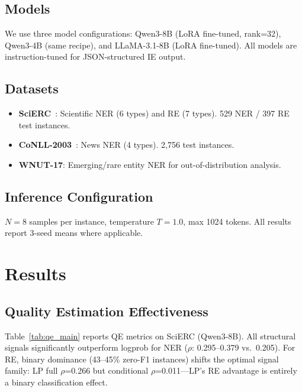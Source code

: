 \documentclass[11pt,a4paper]{article}
\begin{document}
\subsection{Models}
We use three model configurations: Qwen3-8B (LoRA fine-tuned, rank=32), Qwen3-4B (same recipe), and LLaMA-3.1-8B (LoRA fine-tuned). All models are instruction-tuned for JSON-structured IE output.

\subsection{Datasets}
\begin{itemize}
    \item \textbf{SciERC}~\cite{luan2018multi}: Scientific NER (6 types) and RE (7 types). 529 NER / 397 RE test instances.
    \item \textbf{CoNLL-2003}~\cite{tjong2003introduction}: News NER (4 types). 2,756 test instances.
    \item \textbf{WNUT-17}: Emerging/rare entity NER for out-of-distribution analysis.
\end{itemize}

\subsection{Inference Configuration}
$N{=}8$ samples per instance, temperature $T{=}1.0$, max 1024 tokens. All results report 3-seed means where applicable.

\section{Results}

\subsection{Quality Estimation Effectiveness}

Table~\ref{tab:qe_main} reports QE metrics on SciERC (Qwen3-8B). All structural signals significantly outperform logprob for NER ($\rho$: 0.295--0.379 vs.\ 0.205). For RE, binary dominance (43--45\% zero-F1 instances) shifts the optimal signal family: LP full $\rho$=0.266 but conditional $\rho$=0.011---LP's RE advantage is entirely a binary classification effect.
\end{document}
